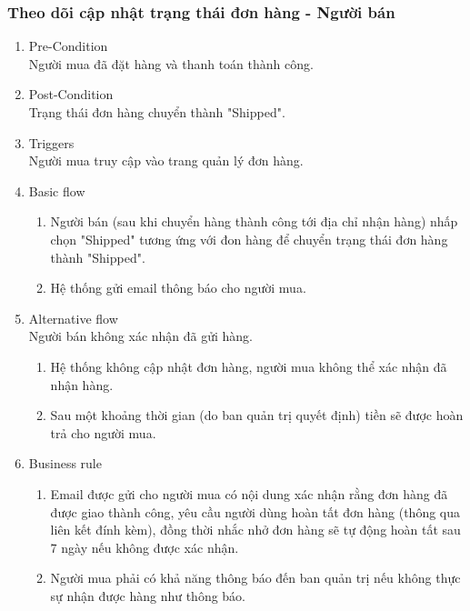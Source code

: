 \subsubsection{Theo dõi cập nhật trạng thái đơn hàng - Người bán}
\begin{enumerate}
	\item Pre-Condition\\
	Người mua đã đặt hàng và thanh toán thành công.
	\item Post-Condition\\
	Trạng thái đơn hàng chuyển thành "Shipped".
	\item Triggers\\
	Người mua truy cập vào trang quản lý đơn hàng.
	\item Basic flow
	\begin{enumerate}
		\item Người bán (sau khi chuyển hàng thành công tới địa chỉ nhận hàng) nhấp chọn "Shipped" tương ứng với đon hàng để chuyển trạng thái đơn hàng thành "Shipped".
		\item Hệ thống gửi email thông báo cho người mua.
	\end{enumerate}
	\item Alternative flow\\
	Người bán không xác nhận đã gửi hàng.
	\begin{enumerate}
		\item Hệ thống không cập nhật đơn hàng, người mua không thể xác nhận đã nhận hàng.
		\item Sau một khoảng thời gian (do ban quản trị quyết định) tiền sẽ được hoàn trả cho người mua.
	\end{enumerate}
	\item Business rule
	\begin{enumerate}
		\item Email được gửi cho người mua có nội dung xác nhận rằng đơn hàng đã được giao thành công, yêu cầu người dùng hoàn tất đơn hàng (thông qua liên kết đính kèm), đồng thời nhắc nhở đơn hàng sẽ tự động hoàn tất sau 7 ngày nếu không được xác nhận.
		\item Người mua phải có khả năng thông báo đến ban quản trị nếu không thực sự nhận được hàng như thông báo.
	\end{enumerate}
\end{enumerate}

